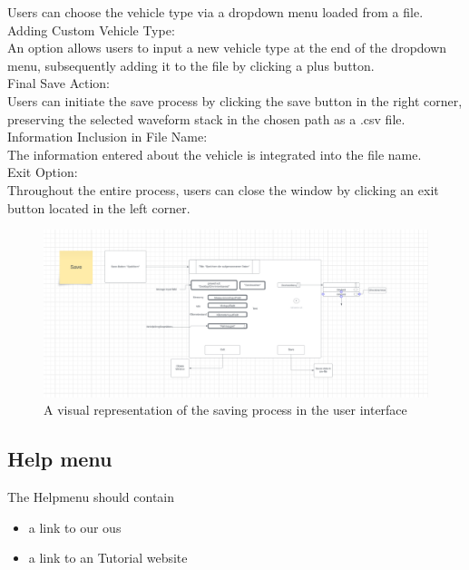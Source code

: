 \documentclass{scrreprt}
\begin{document}
Users can choose the vehicle type via a dropdown menu loaded from a file.\\
Adding Custom Vehicle Type:\\

An option allows users to input a new vehicle type at the end of the dropdown menu, subsequently adding it to the file by clicking a plus button.\\
Final Save Action:\\

Users can initiate the save process by clicking the save button in the right corner, preserving the selected waveform stack in the chosen path as a .csv file.\\
Information Inclusion in File Name:\\

The information entered about the vehicle is integrated into the file name.\\
Exit Option:\\

Throughout the entire process, users can close the window by clicking an exit button located in the left corner.\\


\begin{figure}
    \includegraphics[width=.9\textwidth]{./assets/pictures/SaveandOpenLucidChartScreenshot.png}
    \caption[]{A visual representation of the saving process in the user interface}
    \label{fig:saveData}
\end{figure}

\subsection{Help menu}

The Helpmenu should contain 
\begin{itemize}
    \item a link to our ous
    \item a link to an Tutorial website
\end{itemize}







\printglossaries
\end{document}
